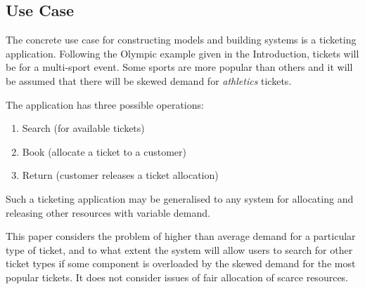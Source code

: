 \documentclass[runningheads]{llncs}
\begin{document}
\subsection{Use Case}

The concrete use case for constructing models and building systems is a ticketing application.  Following the Olympic example given in the Introduction, tickets will be for a multi-sport event.  Some sports are more popular than others and it will be assumed that there will be skewed demand for {\itshape athletics} tickets.

The application has three possible operations:
\begin{enumerate}
\item Search (for available tickets)
\item Book (allocate a ticket to a customer)
\item Return (customer releases a ticket allocation)
\end{enumerate}

Such a ticketing application may be generalised to any system for allocating and releasing other resources with variable demand.

This paper considers the problem of higher than average demand for a particular type of ticket, and to what extent the system will allow users to search for other ticket types if some component is overloaded by the skewed demand for the most popular tickets.  It does not consider issues of fair allocation of scarce resources.

%
%



%
%



%
%



%
%



%
%



%
%



%
%



\end{document}
